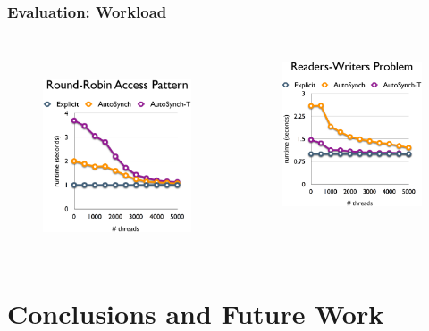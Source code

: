 \documentclass[mathserif,14pt,xcolor=table]{beamer}
\begin{document}
\begin{frame}
    \frametitle{Evaluation: Workload}
    \begin{columns}[c]
        \begin{figure}[ht!]
            \centering~
            \includegraphics[width=56mm]{fig/srr.eps}
        \label{fig:rr_ratio}
        \end{figure}

        \begin{figure}[ht!]                                                             
            \centering                                                                    
            \includegraphics[width=56mm]{fig/strw.eps}                                    
        \label{fig:trw_ratio}                                                           
        \end{figure}
    \end{columns}
\end{frame}

\section{Conclusions and Future Work}
\end{document}
